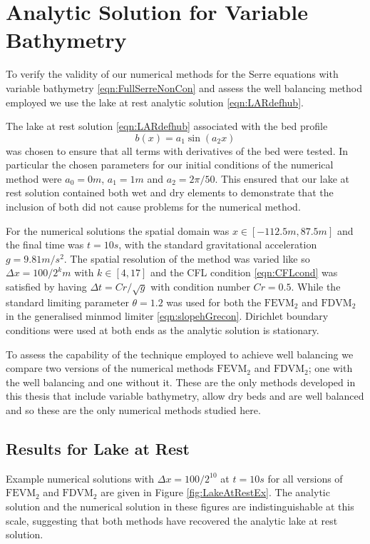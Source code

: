 \section{Analytic Solution for Variable Bathymetry}

To verify the validity of our numerical methods for the Serre equations with variable bathymetry \eqref{eqn:FullSerreNonCon} and assess the well balancing method employed we use the lake at rest analytic solution \eqref{eqn:LARdefhub}. 

The lake at rest solution \eqref{eqn:LARdefhub} associated with the bed profile
\begin{equation}
b(x) = a_1 \sin\left(a_2 x\right)
\end{equation}
was chosen to ensure that all terms with derivatives of the bed were tested. In particular the chosen parameters for our initial conditions of the numerical method were $a_0 = 0m$, $a_1 = 1m$ and $a_2 = 2 \pi / 50 $. This ensured that our lake at rest solution contained both wet and dry elements to demonstrate that the inclusion of both did not cause problems for the numerical method.

For the numerical solutions the spatial domain was $x \in \left[-112.5 m,87.5 m\right]$ and the final time was $t=10s$, with the standard gravitational acceleration $g= 9.81 m/s^2$. The spatial resolution of the method was varied like so $\Delta x = 100 / 2^k m$ with $k \in \left[4,17\right]$ and the CFL condition \eqref{eqn:CFLcond} was satisfied by having $\Delta t = Cr / \sqrt{g}$ with condition number $Cr = 0.5$. While the standard limiting parameter $\theta = 1.2$ was used for both the $\text{FEVM}_2$ and $\text{FDVM}_2$ in the generalised minmod limiter \eqref{eqn:slopehGrecon}. Dirichlet boundary conditions were used at both ends as the analytic solution is stationary. 

To assess the capability of the technique employed to achieve well balancing we compare two versions of the numerical methods $\text{FEVM}_2$ and $\text{FDVM}_2$; one with the well balancing and one without it. These are the only methods developed in this thesis that include variable bathymetry, allow dry beds and are well balanced and so these are the only numerical methods studied here.   

\subsection{Results for Lake at Rest}
Example numerical solutions with $\Delta x = 100/2^{10}$ at $t=10s$ for all versions of $\text{FEVM}_2$ and $\text{FDVM}_2$ are given in Figure \ref{fig:LakeAtRestEx}. The analytic solution and the numerical solution in these figures are indistinguishable at this scale, suggesting that both methods have recovered the analytic lake at rest solution.  


